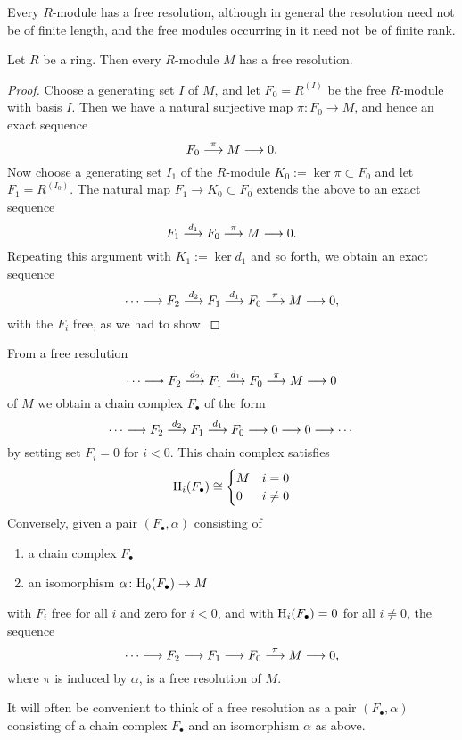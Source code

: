 Every $R$-module has a free resolution, although in general the resolution need not be of finite length, and the free modules occurring in it need  not be of finite rank.

\begin{proposition}\label{prop:free-resolutions-exist}
Let $R$ be a ring. Then every $R$-module $M$ has  a  free resolution.
\end{proposition}

\begin{proof}
Choose a generating set $I$ of $M$, and let $F_0= R^{(I)}$ be the free $R$-module with basis $I$. Then we have a natural surjective map $\pi\colon F_0\to M$, and hence an exact sequence
\[
	F_0 \overset{\pi}{\longrightarrow} M \longrightarrow 0.
\]
Now choose a generating set $I_1$ of the $R$-module 
 $K_0 := \ker \pi \subset F_0$ and let $F_1=R^{(I_0)}$. The natural map $F_1 \to K_0 \subset F_0$
 extends the above to an exact sequence
 \[
 	F_1 \overset{d_1}{\longrightarrow} F_0 \overset{\pi}{\longrightarrow} M \longrightarrow 0.
\]
Repeating this argument with $K_1 := \ker d_1$ and so forth, we obtain an exact sequence
\[
	\cdots \longrightarrow F_2 \overset{d_2}{\longrightarrow} F_1 \overset{d_1}{\longrightarrow} F_0 \overset{\pi}{\longrightarrow} M \longrightarrow 0,
\]
with the $F_i$ free, as we had to show.
\end{proof}

\begin{remark}From a free resolution
\[
	\cdots \longrightarrow F_2 \overset{d_2}{\longrightarrow} F_1 \overset{d_1}{\longrightarrow} F_0 \overset{\pi}{\longrightarrow} M \longrightarrow 0 
\]
of $M$ we obtain a chain complex $F_\bullet$ of the form
\[
	\cdots \longrightarrow F_2 \overset{d_2}{\longrightarrow} F_1 \overset{d_1}{\longrightarrow} F_0 \longrightarrow 0 \longrightarrow  0 \longrightarrow \cdots
\]
by setting set $F_{i}=0$ for $i<0$.  This chain complex satisfies
\[
	 {\mathrm H}_i(F_\bullet) \cong \begin{cases} M & i=0 \\ 0 & i \neq 0 \end{cases}
\]
Conversely, given a pair $(F_\bullet,\alpha)$ consisting of
\begin{enumerate}
\item a chain complex $F_\bullet$ 
\item an isomorphism $\alpha\colon {\mathrm H}_0(F_\bullet) \to M$
\end{enumerate}
with $F_i$ free for all $i$ and zero for $i<0$, and with ${\mathrm H}_i(F_\bullet)=0$ for all $i\neq 0$, the sequence
\[
	\cdots \longrightarrow F_2 \longrightarrow F_1 \longrightarrow F_0 \overset{\pi} {\longrightarrow} M \longrightarrow 0,
\]
where $\pi$ is induced by $\alpha$, is a free resolution of $M$. 

It will often be convenient to think of a free resolution as a pair $(F_\bullet,\alpha)$ consisting of a chain complex $F_\bullet$ and an isomorphism $\alpha$ as above.
\end{remark}


